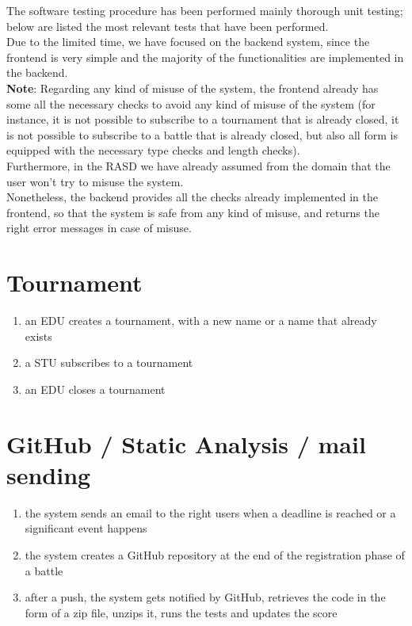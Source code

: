 The software testing procedure has been performed mainly thorough unit testing; below are listed the most relevant tests that have been performed.\\
Due to the limited time, we have focused on the backend system, since the frontend is very simple and the majority of the functionalities are implemented in the backend.\\

\textbf{Note}: Regarding any kind of misuse of the system, the frontend already has some all the necessary checks to avoid any kind of misuse of the system (for instance, it is not possible to subscribe to a tournament that is already closed, it is not possible to subscribe to a battle that is already closed, but also all form is equipped with the necessary type checks and length checks).\\
Furthermore, in the RASD we have already assumed from the domain that the user won't try to misuse the system.\\
Nonetheless, the backend provides all the checks already implemented in the frontend, so that the system is safe from any kind of misuse, and returns the right error messages in case of misuse.

\section{Tournament}

\begin{enumerate}
    \item an EDU creates a tournament, with a new name or a name that already exists
    \item a STU subscribes to a tournament
    \item an EDU closes a tournament
\end{enumerate}

\section{GitHub / Static Analysis / mail sending}

\begin{enumerate}
    \item the system sends an email to the right users when a deadline is reached or a significant event happens
    \item the system creates a GitHub repository at the end of the registration phase of a battle
    \item after a push, the system gets notified by GitHub, retrieves the code in the form of a zip file, unzips it, runs the tests and updates the score
\end{enumerate}

